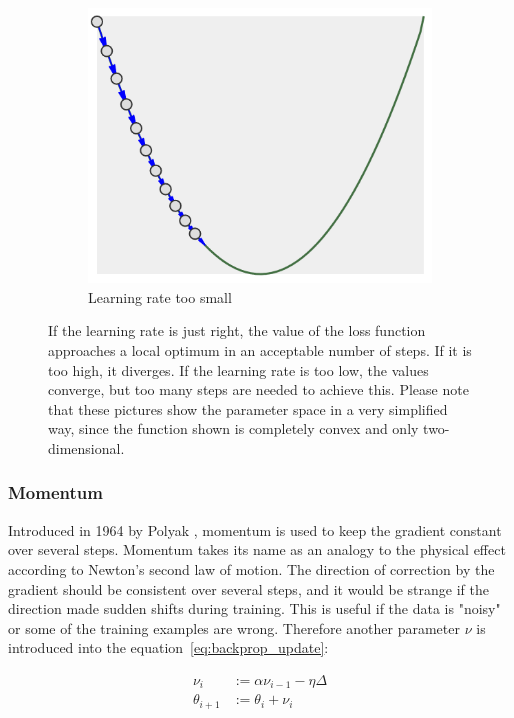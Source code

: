 \begin{figure}
\begin{subfigure}[b]{0.3\textwidth}
        \includegraphics[width=\textwidth]{images/lr_too_low.png}
        \caption{Learning rate too small}
        \label{fig:lr_too-low}
    \end{subfigure}
    \caption{If the learning rate is just right, the value of the loss function approaches a local optimum in an acceptable number of steps.
    If it is too high, it diverges.
    If the learning rate is too low, the values converge, but too many steps are needed to achieve this.
    Please note that these pictures show the parameter space in a very simplified way, since the function shown is completely convex and only two-dimensional.}
    \label{fig:learning_rate}
\end{figure}

\subsubsection{Momentum}

Introduced in 1964 by Polyak \cite{Polyak1964}, momentum is used to keep the gradient constant over several steps.
Momentum takes its name as an analogy to the physical effect according to Newton's second law of motion.
The direction of correction by the gradient should be consistent over several steps, and it would be strange if the direction made sudden shifts during training.
This is useful if the data is "noisy" or some of the training examples are wrong.
Therefore another parameter $\nu$ is introduced into the equation~\eqref{eq:backprop_update}:

\begin{equation}
    \begin{split}
        \nu_{i} &:= \alpha \nu_{i-1} - \eta \varDelta \\
        \theta_{i+1} &:= \theta_i + \nu_i
    \end{split}
    \label{eq:momentum}
\end{equation}

